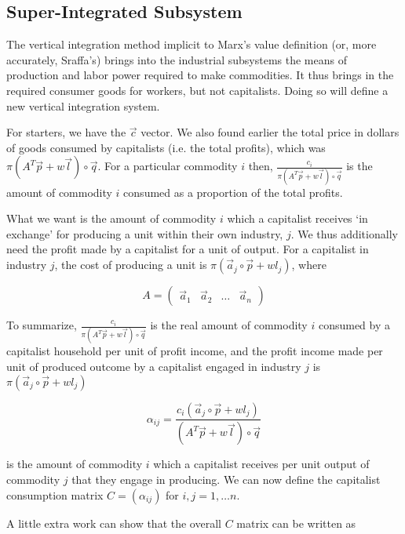 \documentclass{article}
\theoremstyle{definition}
\begin{document}
\subsection{Super-Integrated Subsystem}

The vertical integration method implicit to Marx's value definition  (or, more accurately, Sraffa's) brings into the industrial subsystems the means of production and labor power required to make commodities. It thus brings in the required consumer goods for workers, but not capitalists. Doing so will define a new vertical integration system. 

For starters, we have the $\vec{c}$ vector. We also found earlier the total price in dollars of goods consumed by capitalists (i.e. the total profits), which was $\pi(A^T\vec{p}+w\vec{l})\circ \vec{q}$. For a particular commodity $i$ then, $\frac{c_i}{\pi(A^T\vec{p}+w\vec{l})\circ \vec{q}}$ is the amount of commodity $i$ consumed as a proportion of the total profits. 

What we want is the amount of commodity $i$ which a capitalist receives `in exchange' for producing a unit within their own industry, $j$. We thus additionally need the profit made by a capitalist for a unit of output. For a capitalist in industry $j$, the cost of producing a unit is $\pi(\vec{a}_j\circ \vec{p}+wl_j)$, where 

\begin{equation}
    A = \begin{pmatrix} \vec{a}_1 & \vec{a}_2 & \ldots & \vec{a}_n \end{pmatrix}
\end{equation}

To summarize, $\frac{c_i}{\pi(A^T\vec{p}+w\vec{l})\circ \vec{q}}$ is the real amount of commodity $i$ consumed by a capitalist household per unit of profit income, and the profit income made per unit of produced outcome by a capitalist engaged in industry $j$ is $\pi(\vec{a}_j\circ \vec{p}+wl_j)$

\begin{equation}
    \alpha_{ij} = \frac{c_i(\vec{a}_j\circ \vec{p}+wl_j)}{(A^T\vec{p}+w\vec{l})\circ \vec{q}}
\end{equation}

is the amount of commodity $i$ which a capitalist receives per unit output of commodity $j$ that they engage in producing. We can now define the capitalist consumption matrix $C = (\alpha_{ij})$ for $i,j = 1,\ldots n$. 

A little extra work can show that the overall $C$ matrix can be written as
\end{document}
